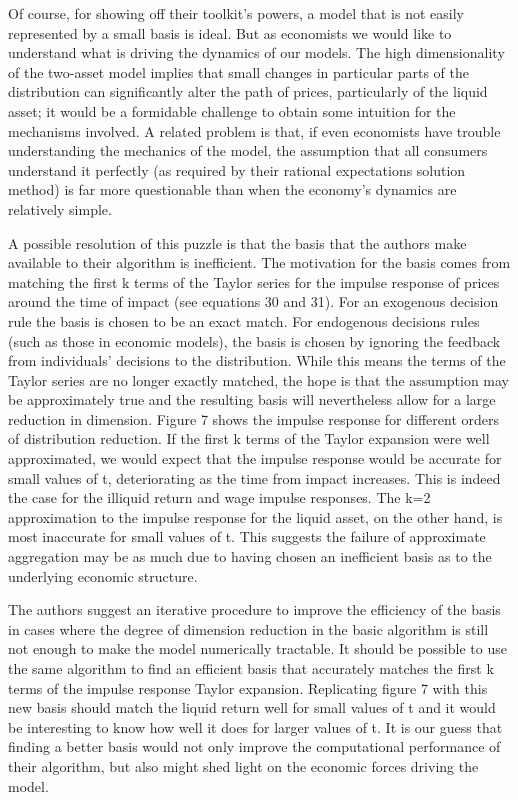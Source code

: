 \documentclass[titlepage]{econtex}
\begin{document}
Of course, for showing off their toolkit's powers, a model that is not easily represented by a small basis is ideal.  But as economists we would like to understand what is driving the dynamics of our models. The high dimensionality of the two-asset model implies that small changes in particular parts of the distribution can significantly alter the path of prices, particularly of the liquid asset; it would be a formidable challenge to obtain some intuition for the mechanisms involved.  A related problem is that, if even economists have trouble understanding the mechanics of the model, the assumption that all consumers understand it perfectly (as required by their rational expectations solution method) is far more questionable than when the economy's dynamics are relatively simple.

A possible resolution of this puzzle is that the basis that the authors make available to their algorithm is inefficient. The motivation for the basis comes from matching the first k terms of the Taylor series for the impulse response of prices around the time of impact (see equations 30 and 31). For an exogenous decision rule the basis is chosen to be an exact match. For endogenous decisions rules (such as those in economic models), the basis is chosen by ignoring the feedback from individuals' decisions to the distribution. While this means the terms of the Taylor series are no longer exactly matched, the hope is that the assumption may be approximately true and the resulting basis will nevertheless allow for a large reduction in dimension. Figure 7 shows the impulse response for different orders of distribution reduction. If the first k terms of the Taylor expansion were well approximated, we would expect that the impulse response would be accurate for small values of t, deteriorating as the time from impact increases. This is indeed the case for the illiquid return and wage impulse responses. The k=2 approximation to the impulse response for the liquid asset, on the other hand, is most inaccurate for small values of t. This suggests the failure of approximate aggregation may be as much due to having chosen an inefficient basis as to the underlying economic structure.

The authors suggest an iterative procedure to improve the efficiency of the basis in cases where the degree of dimension reduction in the basic algorithm is still not enough to make the model numerically tractable. It should be possible to use the same algorithm to find an efficient basis that accurately matches the first k terms of the impulse response Taylor expansion. Replicating figure 7 with this new basis should match the liquid return well for small values of t and it would be interesting to know how well it does for larger values of t. It is our guess that finding a better basis would not only improve the computational performance of their algorithm, but also might shed light on the economic forces driving the model.
\end{document}
